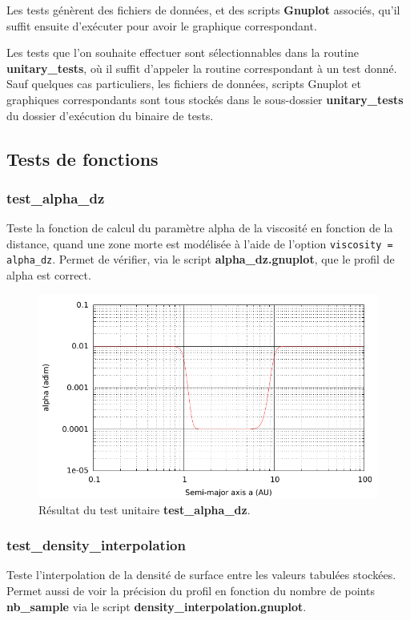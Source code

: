 Les tests génèrent des fichiers de données, et des scripts \textbf{Gnuplot} associés, qu'il suffit ensuite d'exécuter pour avoir le graphique correspondant. 

Les tests que l'on souhaite effectuer sont sélectionnables dans la routine \textbf{unitary\_tests}, où il suffit d'appeler la routine correspondant à un test donné. Sauf quelques cas particuliers, les fichiers de données, scripts Gnuplot et graphiques correspondants sont tous stockés dans le sous-dossier \textbf{unitary\_tests} du dossier d'exécution du binaire de tests.

\subsection{Tests de fonctions}
\subsubsection{test\_alpha\_dz}
Teste la fonction de calcul du paramètre alpha de la viscosité en fonction de la distance, quand une zone morte est modélisée à l'aide de l'option \verb|viscosity = alpha_dz|. Permet de vérifier, via le script \textbf{alpha\_dz.gnuplot}, que le profil de alpha est correct.


\begin{figure}[htbp]
\centering
\includegraphics[width=0.65\linewidth]{figure/unitary_tests/alpha_dz.pdf}
\caption{Résultat du test unitaire \textbf{test\_alpha\_dz}.}
\end{figure}

\subsubsection{test\_density\_interpolation}
Teste l'interpolation de la densité de surface entre les valeurs tabulées stockées. Permet aussi de voir la précision du profil en fonction du nombre de points \textbf{nb\_sample} via le script \textbf{density\_interpolation.gnuplot}.

